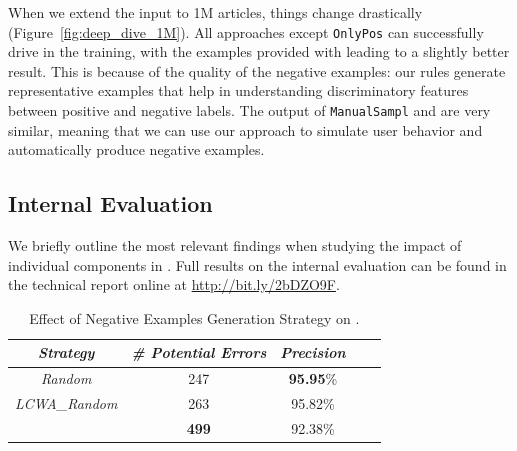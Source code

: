 When we extend the input to 1M articles, things change drastically (Figure~\ref{fig:deep_dive_1M}). All approaches except \texttt{OnlyPos} can successfully drive \deepdive in the training, with the examples provided with \krd leading to a slightly better result. This is because of the quality of the negative examples: our rules generate representative examples that help \deepdive in understanding discriminatory features between positive and negative labels.
The output of \texttt{ManualSampl} and \krd are very similar, meaning that we can use our approach to simulate user behavior and automatically produce negative examples. 

\vspace{-1ex}
\subsection{Internal Evaluation} \label{sec:krd_int_evaluation}
\vspace{-1ex}
We briefly outline the most relevant findings when studying the impact of individual components in \krd.
Full results on the internal evaluation %
can be found in the technical report online at \url{http://bit.ly/2bDZO9F}.

\begin{table}[htb]
	\centering
	\caption{Effect of Negative Examples Generation Strategy on \dbpedia.}
	\label{tab:random_neg_examples}
	\begin{tabular}{|c|c|c|c|c|}
		\hline
		\hline
		{\it Strategy}&{\it \# Potential Errors} & {\it Precision} \tabularnewline
		\hline
		\emph{Random} & 247 & \textbf{95.95}\%\tabularnewline
		\emph{LCWA\_Random} & 263 & 95.82\% \tabularnewline
		\krd & \textbf{499} & 92.38\%\tabularnewline
		\hline
	\end{tabular}
\end{table}

